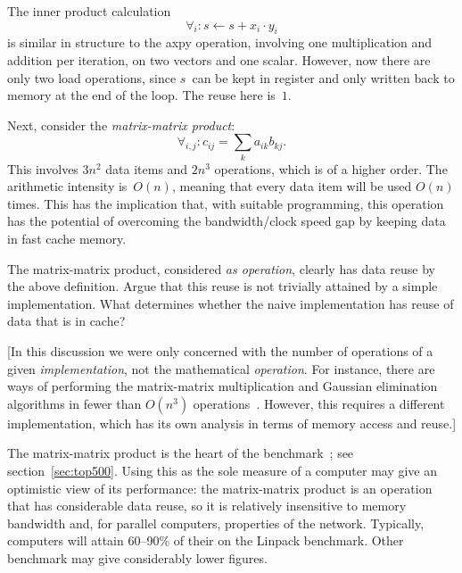 The inner product calculation 
\[ \forall_i\colon s\leftarrow s+x_i\cdot y_i
\]
is similar in structure to the axpy operation, involving one
multiplication and addition per iteration, on two vectors and one
scalar. However, now there are only two load operations, since $s$~can
be kept in register and only written back to memory at the end of the
loop. The reuse here is~$1$.


Next, consider the \emph{matrix-matrix product}:
\[ \forall_{i,j}\colon c_{ij} = \sum_k a_{ik}b_{kj}. \] This involves
$3n^2$ data items and $2n^3$ operations, which is of a
higher order. The arithmetic intensity is~$O(n)$, meaning that every data item
will be used $O(n)$ times.  This has the implication that, with
suitable programming, this operation has the potential of overcoming
the bandwidth/clock speed gap by keeping data in fast cache memory.

\begin{exercise}
  The matrix-matrix product, considered \emph{as operation}, clearly
  has data reuse by the above definition. Argue that this reuse is not
  trivially attained by a simple implementation. What determines
  whether the naive implementation has  reuse of data that is in cache?
\end{exercise}

[In this discussion we were only concerned with the number of
  operations of a given \emph{implementation}, not the mathematical
  \emph{operation}. For instance, there are ways of performing the
  matrix-matrix multiplication and Gaussian elimination algorithms in
  fewer than $O(n^3)$
  operations~\cite{St:gaussnotoptimal,Pa:combinations}. However, this
  requires a different implementation, which has its own analysis in
  terms of memory access and reuse.]

The matrix-matrix product is the heart of the 
{benchmark}~\cite{Dongarra1987LinpackBenchmark}; see
section~\ref{sec:top500}. Using this as the sole measure of
 a computer may give an optimistic view of its
performance: the matrix-matrix product is an operation
that has considerable data reuse, so it is relatively insensitive to
memory bandwidth and, for parallel computers, properties of the
network. Typically, computers will attain 60--90\% of their
 on the Linpack benchmark. Other benchmark
may give considerably lower figures.

